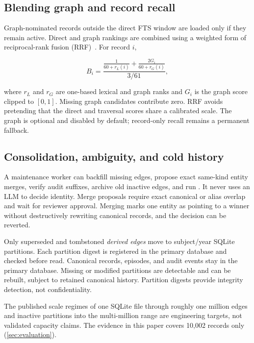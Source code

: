 \subsection{Blending graph and record recall}

Graph-nominated records outside the direct FTS window are loaded only if they remain active. Direct and graph rankings are combined using a weighted form of reciprocal-rank fusion (RRF)~\cite{cormack2009rrf}. For record $i$,

\begin{equation}
B_i=\frac{\frac{1}{60+r_L(i)}+\frac{2G_i}{60+r_G(i)}}{3/61},
\label{eq:rrf}
\end{equation}

where $r_L$ and $r_G$ are one-based lexical and graph ranks and $G_i$ is the graph score clipped to $[0,1]$. Missing graph candidates contribute zero. RRF avoids pretending that the direct and traversal scores share a calibrated scale. The graph is optional and disabled by default; record-only recall remains a permanent fallback.

\subsection{Consolidation, ambiguity, and cold history}

A maintenance worker can backfill missing edges, propose exact same-kind entity merges, verify audit suffixes, archive old inactive edges, and run . It never uses an LLM to decide identity. Merge proposals require exact canonical or alias overlap and wait for reviewer approval. Merging marks one entity as pointing to a winner without destructively rewriting canonical records, and the decision can be reverted.

Only superseded and tombstoned \emph{derived edges} move to subject/year SQLite partitions. Each partition digest is registered in the primary database and checked before read. Canonical records, episodes, and audit events stay in the primary database. Missing or modified partitions are detectable and can be rebuilt, subject to retained canonical history. Partition digests provide integrity detection, not confidentiality.

The published scale regimes of one SQLite file through roughly one million edges and inactive partitions into the multi-million range are engineering targets, not validated capacity claims. The evidence in this paper covers 10,002 records only (\cref{sec:evaluation}).
